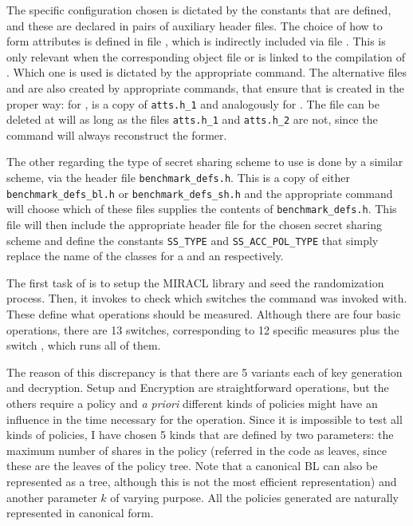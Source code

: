 \documentclass{article}
\begin{document}
The specific configuration chosen is dictated by the constants that are defined, and these are declared in pairs of auxiliary header files. The choice of how to form attributes is defined in file , which is indirectly included via file . This is only relevant when the corresponding object file  or  is linked to the compilation of . Which one is used is dictated by the appropriate \fmake command. The alternative files  and  are also created by appropriate \fmake commands, that ensure that  is created in the proper way: for ,  is a copy of \verb|atts.h_1| and analogously for . 
The file  can be deleted at will as long as the files \verb|atts.h_1| and \verb|atts.h_2| are not, since the \fmake command will always reconstruct the former.

The other regarding the type of secret sharing scheme to use is done by a similar scheme, via the header file \verb|benchmark_defs.h|. This is a copy of either \verb|benchmark_defs_bl.h| or \verb|benchmark_defs_sh.h| and the appropriate \fmake command will choose which of these files supplies the contents of \verb|benchmark_defs.h|. This file will then include the appropriate header file for the chosen secret sharing scheme and define the constants \verb|SS_TYPE| and \verb|SS_ACC_POL_TYPE| that simply replace the name of the classes for a \cSS and an \cAP respectively.

The first task of  is to setup the MIRACL library and seed the randomization process. Then, it invokes  to check which switches the command was invoked with. These define what operations should be measured. Although there are four basic operations, there are 13 switches, corresponding to 12 specific measures plus the switch , which runs all of them.

The reason of this discrepancy is that there are 5 variants each of key generation and decryption. Setup and Encryption are straightforward operations, but the others require a policy and \emph{a priori} different kinds of policies might have an influence in the time necessary for the operation. Since it is impossible to test all kinds of policies, I have chosen 5 kinds that are defined by two parameters: the maximum number of shares in the policy (referred in the code as leaves, since these are the leaves of the policy tree. Note that a canonical BL can also be represented as a tree, although this is not the most efficient representation) and another parameter $k$ of varying purpose. All the policies generated are naturally represented in canonical form. 
\end{document}

